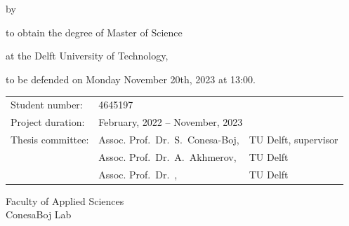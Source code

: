 \begin{titlepage}

\begin{center}

{\makeatletter
\largetitlestyle\fontsize{45}{45}\selectfont\@title
\makeatother}

{\makeatletter
\ifdefvoid{\@subtitle}{}{\bigskip\titlestyle\fontsize{20}{20}\selectfont\@subtitle}
\makeatother}

\bigskip
\bigskip

by

\bigskip
\bigskip

{\makeatletter
\largetitlestyle\fontsize{25}{25}\selectfont\@author
\makeatother}

\bigskip
\bigskip

to obtain the degree of Master of Science

at the Delft University of Technology,

to be defended on Monday November 20th, 2023 at 13:00.

\vfill

\begin{tabular}{lll}
    Student number: & 4645197 \\
    Project duration: & \multicolumn{2}{l}{February, 2022 -- November, 2023} \\
    Thesis committee: & Assoc. Prof.\ Dr.\ S.\ Conesa-Boj, & TU Delft, supervisor \\
        & Assoc. Prof.\ Dr.\ A.\ Akhmerov, & TU Delft \\
        & Assoc. Prof.\ Dr.\ , & TU Delft
\end{tabular}


\bigskip
\bigskip
Faculty of Applied Sciences \\
ConesaBoj Lab \\


\end{center}


\end{titlepage}